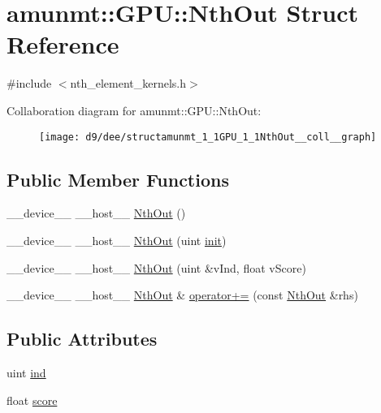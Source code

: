 \hypertarget{structamunmt_1_1GPU_1_1NthOut}{}\section{amunmt\+:\+:G\+PU\+:\+:Nth\+Out Struct Reference}
\label{structamunmt_1_1GPU_1_1NthOut}


{\ttfamily \#include $<$nth\+\_\+element\+\_\+kernels.\+h$>$}



Collaboration diagram for amunmt\+:\+:G\+PU\+:\+:Nth\+Out\+:
\nopagebreak
\begin{figure}[H]
\begin{center}
\leavevmode
\texttt{[image: d9/dee/structamunmt\_1\_1GPU\_1\_1NthOut\_\_coll\_\_graph]}
\end{center}
\end{figure}
\subsection*{Public Member Functions}
\begin{DoxyCompactItemize}
\item 
\+\_\+\+\_\+device\+\_\+\+\_\+ \+\_\+\+\_\+host\+\_\+\+\_\+ \hyperlink{structamunmt_1_1GPU_1_1NthOut_a979359f6888f6eeb9d6b56cdf8d84cb2}{Nth\+Out} ()
\item 
\+\_\+\+\_\+device\+\_\+\+\_\+ \+\_\+\+\_\+host\+\_\+\+\_\+ \hyperlink{structamunmt_1_1GPU_1_1NthOut_a1104066f5ef2fafba6cabf30c159bd2a}{Nth\+Out} (uint \hyperlink{amunmt_8cpp_a2e8ddb8bd2f3405f554c9f2c52277f4b}{init})
\item 
\+\_\+\+\_\+device\+\_\+\+\_\+ \+\_\+\+\_\+host\+\_\+\+\_\+ \hyperlink{structamunmt_1_1GPU_1_1NthOut_ac3421e0f8928a69e805d412d421cb8a3}{Nth\+Out} (uint \&v\+Ind, float v\+Score)
\item 
\+\_\+\+\_\+device\+\_\+\+\_\+ \+\_\+\+\_\+host\+\_\+\+\_\+ \hyperlink{structamunmt_1_1GPU_1_1NthOut}{Nth\+Out} \& \hyperlink{structamunmt_1_1GPU_1_1NthOut_a4bd38b073569507260685323ab0838bd}{operator+=} (const \hyperlink{structamunmt_1_1GPU_1_1NthOut}{Nth\+Out} \&rhs)
\end{DoxyCompactItemize}
\subsection*{Public Attributes}
\begin{DoxyCompactItemize}
\item 
uint \hyperlink{structamunmt_1_1GPU_1_1NthOut_a89541d052910f6067261c305464620e3}{ind}
\item 
float \hyperlink{structamunmt_1_1GPU_1_1NthOut_a112cdd9e5da03e4073d6545a9ee78d42}{score}
\end{DoxyCompactItemize}


